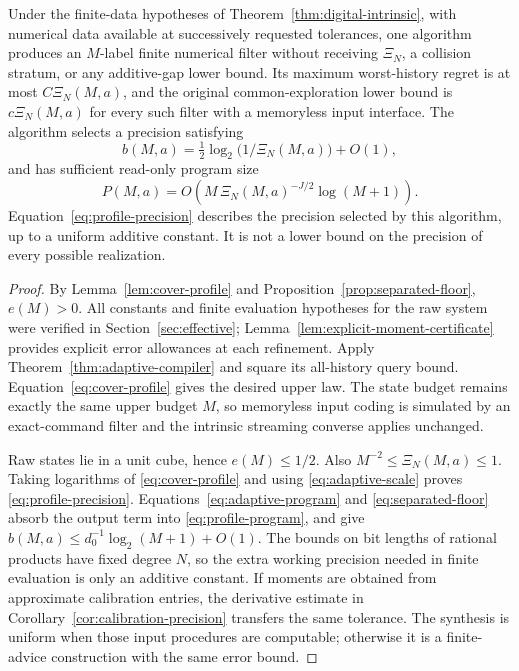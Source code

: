 \begin{theorem}
\label{thm:profile-adaptive}
Under the finite-data hypotheses of Theorem~\ref{thm:digital-intrinsic},
with numerical data available at successively requested tolerances,
one algorithm produces an $M$-label finite numerical filter without
receiving $\Xi_N$, a collision stratum, or any additive-gap lower bound.
Its maximum worst-history regret is at most $C\Xi_N(M,a)$, and the
original common-exploration lower bound is $c\Xi_N(M,a)$ for every
such filter with a memoryless input interface. The algorithm selects a
precision satisfying
\begin{equation}\label{eq:profile-precision}
 b(M,a)=\tfrac12\log_2\bigl(1/\Xi_N(M,a)\bigr)+O(1),
\end{equation}
and has sufficient read-only program size
\begin{equation}\label{eq:profile-program}
 P(M,a)=O\!\left(M\,\Xi_N(M,a)^{-J/2}\log(M+1)\right).
\end{equation}
Equation~\eqref{eq:profile-precision} describes the precision selected
by this algorithm, up to a uniform additive constant. It is not a
lower bound on the precision of every possible realization.
\end{theorem}
\begin{proof}
By Lemma~\ref{lem:cover-profile} and
Proposition~\ref{prop:separated-floor}, $e(M)>0$. All constants and
finite evaluation hypotheses for the raw system were verified in
Section~\ref{sec:effective}; Lemma~\ref{lem:explicit-moment-certificate}
provides explicit error allowances at each refinement. Apply
Theorem~\ref{thm:adaptive-compiler} and square its all-history query
bound. Equation~\eqref{eq:cover-profile} gives the desired upper law.
The state budget remains exactly the same upper budget $M$, so
memoryless input coding is simulated by an exact-command filter and
the intrinsic streaming converse applies unchanged.

Raw states lie in a unit cube, hence $e(M)\le1/2$. Also
$M^{-2}\le\Xi_N(M,a)\le1$. Taking logarithms of
\eqref{eq:cover-profile} and using \eqref{eq:adaptive-scale} proves
\eqref{eq:profile-precision}. Equations~\eqref{eq:adaptive-program}
and \eqref{eq:separated-floor} absorb the output term into
\eqref{eq:profile-program}, and give
$b(M,a)\le d_0^{-1}\log_2(M+1)+O(1)$.
The bounds on bit lengths of rational products have fixed degree $N$,
so the extra working precision needed in finite evaluation is only an
additive constant. If moments are obtained from approximate calibration
entries, the derivative estimate in
Corollary~\ref{cor:calibration-precision} transfers the same tolerance.
The synthesis is uniform when those input procedures are computable;
otherwise it is a finite-advice construction with the same error bound.
\end{proof}

